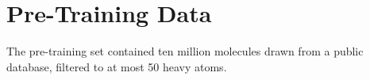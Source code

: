 \chapter{Pre-Training Data}
\label{app:a}

The pre-training set contained ten million molecules drawn from a public database, filtered to
at most 50 heavy atoms.
